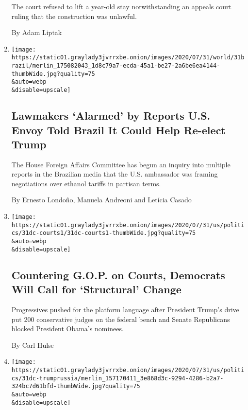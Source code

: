 \begin{enumerate}
  The court refused to lift a year-old stay notwithstanding an appeals
  court ruling that the construction was unlawful.

  By Adam Liptak
\item
  \href{/2020/07/31/world/americas/brazil-trump-ethanol-chapman.html}{}

  \texttt{[image: https://static01.graylady3jvrrxbe.onion/images/2020/07/31/world/31brazil/merlin\_175082043\_1d8c79a7-ecda-45a1-be27-2a6be6ea4144-thumbWide.jpg?quality=75\\\&auto=webp\\\&disable=upscale]}

  \hypertarget{lawmakers-alarmed-by-reports-us-envoy-told-brazil-it-could-help-re-elect-trump}{%
  \subsection{Lawmakers `Alarmed' by Reports U.S. Envoy Told Brazil It
  Could Help Re-elect
  Trump}\label{lawmakers-alarmed-by-reports-us-envoy-told-brazil-it-could-help-re-elect-trump}}

  The House Foreign Affairs Committee has begun an inquiry into multiple
  reports in the Brazilian media that the U.S. ambassador was framing
  negotiations over ethanol tariffs in partisan terms.

  By Ernesto Londoño, Manuela Andreoni and Letícia Casado
\item
  \href{/2020/07/31/us/democrats-judiciary-reform.html}{}

  \texttt{[image: https://static01.graylady3jvrrxbe.onion/images/2020/07/31/us/politics/31dc-courts1/31dc-courts1-thumbWide.jpg?quality=75\\\&auto=webp\\\&disable=upscale]}

  \hypertarget{countering-gop-on-courts-democrats-will-call-for-structural-change}{%
  \subsection{Countering G.O.P. on Courts, Democrats Will Call for
  `Structural'
  Change}\label{countering-gop-on-courts-democrats-will-call-for-structural-change}}

  Progressives pushed for the platform language after President Trump's
  drive put 200 conservative judges on the federal bench and Senate
  Republicans blocked President Obama's nominees.

  By Carl Hulse
\item
  \href{/2020/07/31/us/politics/trump-russia-nato-bounties.html}{}

  \texttt{[image: https://static01.graylady3jvrrxbe.onion/images/2020/07/31/us/politics/31dc-trumprussia/merlin\_157170411\_3e868d3c-9294-4286-b2a7-324bc7d61bfd-thumbWide.jpg?quality=75\\\&auto=webp\\\&disable=upscale]}


\end{enumerate}
